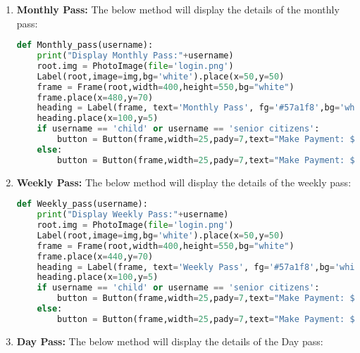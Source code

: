 \documentclass[a4paper,12pt]{report}
\begin{document}
\begin{enumerate}
\item \textbf{Monthly Pass:} The below method will display the details of the monthly pass:\\
\begin{lstlisting}[language=Python]
def Monthly_pass(username):
    print("Display Monthly Pass:"+username)
    root.img = PhotoImage(file='login.png')
    Label(root,image=img,bg='white').place(x=50,y=50)
    frame = Frame(root,width=400,height=550,bg="white")
    frame.place(x=480,y=70)
    heading = Label(frame, text='Monthly Pass', fg='#57a1f8',bg='white',font=('Microsoft YaHei UI Light',23,'bold'))
    heading.place(x=100,y=5)
    if username == 'child' or username == 'senior citizens':
        button = Button(frame,width=25,pady=7,text="Make Payment: $50",bg='#ff8c00',fg='#57a1f8',font=('Microsoft YaHei UI Light',15,'bold','italic'),border=0,highlightbackground="#ff8c00",command=lambda: select_payment_option(username)).place(x=35,y=120)
    else:
        button = Button(frame,width=25,pady=7,text="Make Payment: $60",bg='#ff8c00',fg='#57a1f8',font=('Microsoft YaHei UI Light',15,'bold','italic'),border=0,highlightbackground="#ff8c00",command=lambda: select_payment_option(username)).place(x=35,y=120)
\end{lstlisting}
\item \textbf{Weekly Pass:} The below method will display the details of the weekly pass:\\
\begin{lstlisting}[language=Python]
def Weekly_pass(username):
    print("Display Weekly Pass:"+username)
    root.img = PhotoImage(file='login.png')
    Label(root,image=img,bg='white').place(x=50,y=50)
    frame = Frame(root,width=400,height=550,bg="white")
    frame.place(x=440,y=70)
    heading = Label(frame, text='Weekly Pass', fg='#57a1f8',bg='white',font=('Microsoft YaHei UI Light',23,'bold'))
    heading.place(x=100,y=5)
    if username == 'child' or username == 'senior citizens':
        button = Button(frame,width=25,pady=7,text="Make Payment: $10",bg='#ff8c00',fg='#57a1f8',font=('Microsoft YaHei UI Light',15,'bold','italic'),border=0,highlightbackground="#ff8c00",command=lambda: select_payment_option(username)).place(x=35,y=120)
    else:
        button = Button(frame,width=25,pady=7,text="Make Payment: $15",bg='#ff8c00',fg='#57a1f8',font=('Microsoft YaHei UI Light',15,'bold','italic'),border=0,highlightbackground="#ff8c00",command=lambda: select_payment_option(username)).place(x=35,y=120)
\end{lstlisting}
\item \textbf{Day Pass:} The below method will display the details of the Day pass:\\

\end{enumerate}
\end{document}
